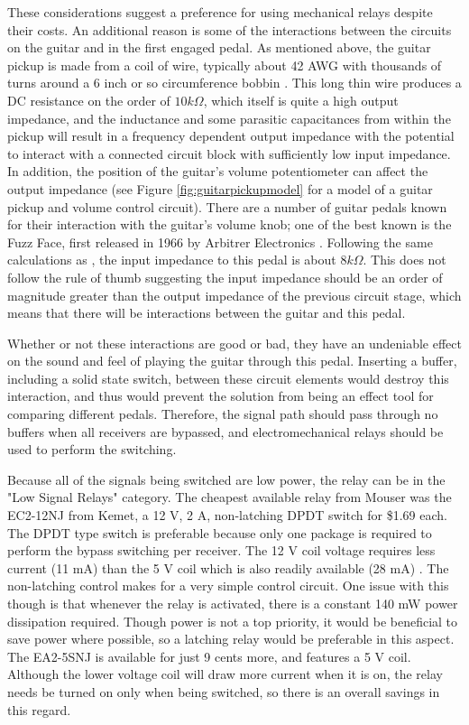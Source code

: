 \documentclass{article}
\begin{document}
		These considerations suggest a preference for using mechanical relays despite their costs.  An additional reason is some of the interactions between the circuits on the guitar and in the first engaged pedal.  As mentioned above, the guitar pickup is made from a coil of wire, typically about 42 AWG with thousands of turns around a 6 inch or so circumference bobbin \cite{StewMacpickups}.  This long thin wire produces a DC resistance on the order of $10k\Omega$, which itself is quite a high output impedance, and the inductance and some parasitic capacitances from within the pickup will result in a frequency dependent output impedance with the potential to interact with a connected circuit block with sufficiently low input impedance.  In addition, the position of the guitar's volume potentiometer can affect the output impedance (see Figure \ref{fig:guitarpickupmodel} for a model of a guitar pickup and volume control circuit).  There are a number of guitar pedals known for their interaction with the guitar's volume knob; one of the best known is the Fuzz Face, first released in 1966 by Arbitrer Electronics \cite{FuzzFace}.  Following the same calculations as \cite{FuzzFace}, the input impedance to this pedal is about $8k\Omega$.  This does not follow the rule of thumb suggesting the input impedance should be an order of magnitude greater than the output impedance of the previous circuit stage, which means that there will be interactions between the guitar and this pedal.

		Whether or not these interactions are good or bad, they have an undeniable effect on the sound and feel of playing the guitar through this pedal.  Inserting a buffer, including a solid state switch, between these circuit elements would destroy this interaction, and thus would prevent the solution from being an effect tool for comparing different pedals.  Therefore, the signal path should pass through no buffers when all receivers are bypassed, and electromechanical relays should be used to perform the switching.

		Because all of the signals being switched are low power, the relay can be in the "Low Signal Relays" category.  The cheapest available relay from Mouser was the EC2-12NJ from Kemet, a 12 V, 2 A, non-latching DPDT switch for \$1.69 each.  The DPDT type switch is preferable because only one package is required to perform the bypass switching per receiver.  The 12 V coil voltage requires less current (11 mA) than the 5 V coil which is also readily available (28 mA) \cite{EC2datasheet}.  The non-latching control makes for a very simple control circuit.  One issue with this though is that whenever the relay is activated, there is a constant 140 mW power dissipation required.  Though power is not a top priority, it would be beneficial to save power where possible, so a latching relay would be preferable in this aspect.  The EA2-5SNJ is available for just 9 cents more, and features a 5 V coil.  Although the lower voltage coil will draw more current when it is on, the relay needs be turned on only when being switched, so there is an overall savings in this regard.
\end{document}
